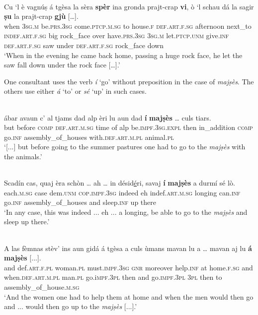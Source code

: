 \ea
\label{}
\\
\gll Cu ‘l è vagnúṣ á tgèsa la sèra \textbf{spèr} ina gronda prajt-crap \textbf{vi}, ò `l schau dá la sagir \textbf{ṣu} la prajt-crap \textbf{gjù} […].\\ 
when \textsc{3sg.m} be.\textsc{prs.3sg} come.\textsc{ptcp.m.sg} to house.\textsc{f} \textsc{def.art.f.sg} afternoon next\_to \textsc{indef.art.f.sg} big rock\_face over have.\textsc{prs.3sg} \textsc{3sg.m} let.\textsc{ptcp.unm} give.\textsc{inf} \textsc{def.art.f.sg} saw under \textsc{def.art.f.sg} rock\_face down\\
\glt `When in the evening he came back home, passing a huge rock face, he let the saw fall down under the rock face […].'
\z

One consultant uses the verb \textit{í} `go' without preposition in the case of \textit{majṣès}. The others use either \textit{á} `to' or \textit{sé} `up' in such cases.

\ea
\label{}
\\
	\gll  [...] ábar avaun c’ al tjams dad alp èri lu aun dad \textbf{í} \textbf{majṣès} … culs tiars.  \\
{} but before \textsc{comp} \textsc{def.art.m.sg} time of alp be.\textsc{impf.3sg.expl} then in\_addition \textsc{comp} go.\textsc{inf} assembly\_of\_houses {} with.\textsc{def.art.m.pl} animal.\textsc{pl}\\
\glt `[...] but before going to the summer pastures one had to go to the \textit{majṣès} with the animals.'
\z

\ea
\label{}
\\
\gll Scadín cas, quaj èra schòn … ah … in désid\underline{é}ri, savaj \textbf{í} \textbf{majṣès} a durmí sé lò.\\
each.\textsc{m.sg} case dem.\textsc{unm} \textsc{cop.impf.3sg} indeed {} eh {} indef.\textsc{art.m.sg} longing can.\textsc{inf} go.\textsc{inf} assembly\_of\_houses and sleep.\textsc{inf} up there\\
\glt `In any case, this was indeed ... eh ... a longing, be able to go to the \textit{majṣès} and sleep up there.'
\z

\ea
\label{}
\\
	\gll A las fèmnas stèv’ ins aun gidá á tgèsa a culs ùmans mavan lu a … mavan aj lu \textbf{á} \textbf{majṣès} [...].\\
and def.\textsc{art.f.pl} woman.\textsc{pl} must.\textsc{impf.3sg} \textsc{gnr} moreover help.\textsc{inf} at home.\textsc{f.sg} and when.\textsc{def.art.m.pl} man.\textsc{pl} go.i\textsc{mpf.3pl} then and {} go.\textsc{impf.3pl} \textsc{3pl} then to assembly\_of\_house.\textsc{m.sg}\\
\glt `And the women one had to help them at home and when the men would then go and ... would then go up to the \textit{majṣès} [...].'
\z

